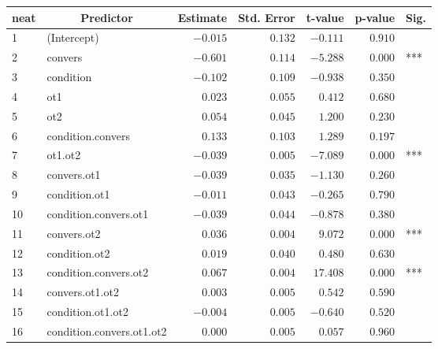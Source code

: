 \begin{table}[!tbp]
\begin{center}
\begin{tabular}{llrrrrl}
\hline\hline
\multicolumn{1}{l}{neat}&\multicolumn{1}{c}{Predictor}&\multicolumn{1}{c}{Estimate}&\multicolumn{1}{c}{Std. Error}&\multicolumn{1}{c}{t-value}&\multicolumn{1}{c}{p-value}&\multicolumn{1}{c}{Sig.}\tabularnewline
\hline
1&(Intercept)&$-0.015$&$0.132$&$-0.111$&$0.910$& \tabularnewline
2&convers&$-0.601$&$0.114$&$-5.288$&$0.000$&***\tabularnewline
3&condition&$-0.102$&$0.109$&$-0.938$&$0.350$& \tabularnewline
4&ot1&$ 0.023$&$0.055$&$ 0.412$&$0.680$& \tabularnewline
5&ot2&$ 0.054$&$0.045$&$ 1.200$&$0.230$& \tabularnewline
6&condition.convers&$ 0.133$&$0.103$&$ 1.289$&$0.197$& \tabularnewline
7&ot1.ot2&$-0.039$&$0.005$&$-7.089$&$0.000$&***\tabularnewline
8&convers.ot1&$-0.039$&$0.035$&$-1.130$&$0.260$& \tabularnewline
9&condition.ot1&$-0.011$&$0.043$&$-0.265$&$0.790$& \tabularnewline
10&condition.convers.ot1&$-0.039$&$0.044$&$-0.878$&$0.380$& \tabularnewline
11&convers.ot2&$ 0.036$&$0.004$&$ 9.072$&$0.000$&***\tabularnewline
12&condition.ot2&$ 0.019$&$0.040$&$ 0.480$&$0.630$& \tabularnewline
13&condition.convers.ot2&$ 0.067$&$0.004$&$17.408$&$0.000$&***\tabularnewline
14&convers.ot1.ot2&$ 0.003$&$0.005$&$ 0.542$&$0.590$& \tabularnewline
15&condition.ot1.ot2&$-0.004$&$0.005$&$-0.640$&$0.520$& \tabularnewline
16&condition.convers.ot1.ot2&$ 0.000$&$0.005$&$ 0.057$&$0.960$& \tabularnewline
\hline
\end{tabular}\end{center}
\end{table}
